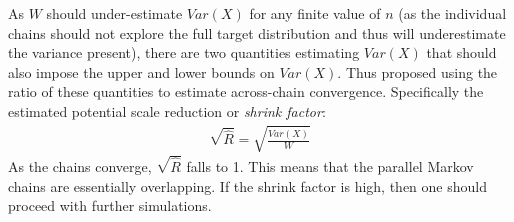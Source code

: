 \documentclass[12pt]{article} %
\begin{document}
	As $W$ should under-estimate $Var(X)$ for any finite value of $n$ (as the individual chains should not explore the full target distribution and thus will underestimate the variance present), there are two quantities estimating $Var(X)$ that should also impose the upper and lower bounds on $Var(X)$. Thus \citet{GelmanInferenceIterativeSimulation1992} proposed using the ratio of these quantities to estimate across-chain convergence. Specifically the estimated potential scale reduction or \emph{shrink factor}:
	\begin{align}
	\sqrt{\hat{R}} = \sqrt{\frac{\hat{Var}(X)}{W}}
	\end{align}
	As the chains converge, $\sqrt{\hat{R}}$ falls to 1. This means that the parallel Markov chains  are  essentially  overlapping.   If  the  shrink  factor  is  high,  then  one  should  proceed  with further simulations.
	


%	
	
	
\end{document}
